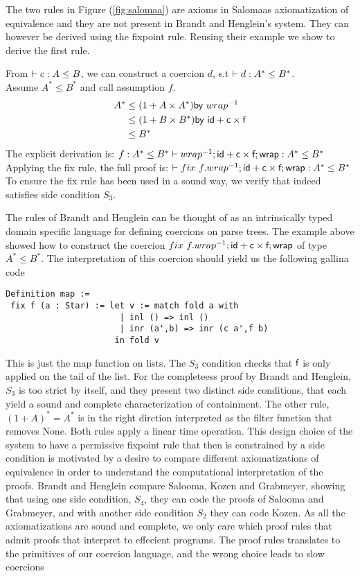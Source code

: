 \documentclass[a4paper,UKenglish,cleveref, autoref, thm-restate]{lipics-v2021}
\begin{document}
The two rules in Figure (\ref{fig:salomaa}) are axioms in Salomaas axiomatization of equivalence and they are not present in Brandt and Henglein's system.
They can however be derived using the fixpoint rule. Reusing their example we show to derive the first rule.
\begin{example}
From $\contains{}{c}{A}{B}$, we can construct a coercion $d$, s.t $\contains{}{d}{A^*}{B^*}$.\\
Assume $A^* \leq B^*$ and call assumption $f$.
\begin{align}
  A^* &\leq (1 + A \times A^*) \textsf{by} ~\dslcominv{wrap}\\
&\leq  (1 + B \times B^*) \textsf{by} ~\dslcom{id}+ \dslcom{c} \times \dslcom{f}\\
&\leq B^*
\end{align}
The explicit derivation is:
$\contains{f : A^* \leq B^*}{\dslcominv{wrap} ; \dslcom{id} + \dslcom{c} \times \dslcom{f};  \dslcom{wrap}}{A^*}{B^*}$\\
Applying the fix rule, the full proof is:
$\contains{}{\fix~f. \dslcominv{wrap} ; \dslcom{id} + \dslcom{c} \times \dslcom{f};  \dslcom{wrap}}{A^*}{B^*}$\\
To ensure the fix rule has been used in a sound way, we verify that indeed satisfies side condition $S_3$.\\
\end{example}
The rules of Brandt and Henglein can be thought of as an intrinsically typed domain specific language for defining coercions on parse trees.
The example above showed how to construct the coercion $\fix~f. \dslcominv{wrap} ; \dslcom{id} + \dslcom{c} \times \dslcom{f};  \dslcom{wrap}$ of type $A^* \leq B^*$. The interpretation of this coercion should yield us the following gallina code
\begin{verbatim}
Definition map := 
 fix f (a : Star) := let v := match fold a with 
                       | inl () => inl ()
                       | inr (a',b) => inr (c a',f b)
                      in fold v
\end{verbatim}
This is just the map function on lists. The $S_3$ condition checks that $\textsf{f}$ is only applied on the tail of the list. For the completeess proof by Brandt and Henglein, $S_3$ is too strict by itself, and they present two distinct side conditions, that each yield a sound and complete characterization of containment. The other rule, $(1 + A)^* = A^*$ is in the right dirction interpreted as the filter function that removes \textsf{None}. Both rules apply a linear time operation.
 This design choice of the system to have a permissive fixpoint rule that then is constrained by a side condition is motivated by a desire to compare different axiomatizations of equivalence in order to understand the computational interpretation of the proofs. Brandt and Henglein compare Salooma, Kozen and Grabmeyer, showing that using one side condition, $S_4$, they can code the proofs of Salooma and Grabmeyer, and with another side condition $S_2$ they can code Kozen. As all the axiomatizations are sound and complete, we only care which proof rules that admit proofs that interpret to effecient programs. The proof rules translates to the primitives of our coercion language, and the wrong choice leads to slow coercions
\end{document}
